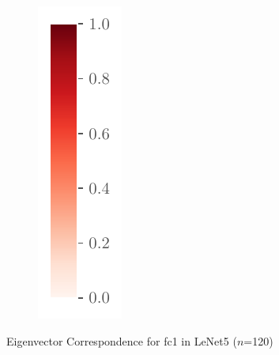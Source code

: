 \begin{figure}[ht]
    \begin{subfigure}[t]{0.065\textwidth}
        \centering
        \includegraphics[width=\textwidth]{Figures/Misc/colorbar.pdf}
    \end{subfigure}
    \caption{Eigenvector Correspondence for fc1 in LeNet5 ($n$=120)}
    \label{fig:Corr_fc_approx}
\end{figure}
